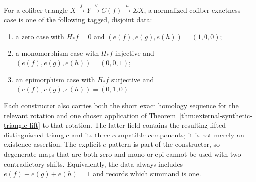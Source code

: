 \begin{definition}
  \label{def:normalized-synthetic-exactness-case}
  \notready
  For a cofiber triangle
  $X\xrightarrow fY\xrightarrow gC(f)\xrightarrow h\Sigma X$, a normalized
  cofiber exactness case is one of the following tagged, disjoint data:
  \begin{enumerate}
    \item a zero case with $H_*f=0$ and
      $(e(f),e(g),e(h))=(1,0,0)$;
    \item a monomorphism case with $H_*f$ injective and
      $(e(f),e(g),e(h))=(0,0,1)$;
    \item an epimorphism case with $H_*f$ surjective and
      $(e(f),e(g),e(h))=(0,1,0)$.
  \end{enumerate}
  Each constructor also carries both the short exact homology sequence for the
  relevant rotation and one chosen application of
  Theorem~\ref{thm:external-synthetic-triangle-lift} to that rotation.  The
  latter field contains the resulting lifted distinguished triangle and its
  three compatible components; it is not merely an existence assertion.  The explicit
  $e$-pattern is part of the constructor, so degenerate maps that are both zero
  and mono or epi cannot be used with two contradictory shifts.  Equivalently,
  the data always includes $e(f)+e(g)+e(h)=1$ and records which summand is one.
\end{definition}



